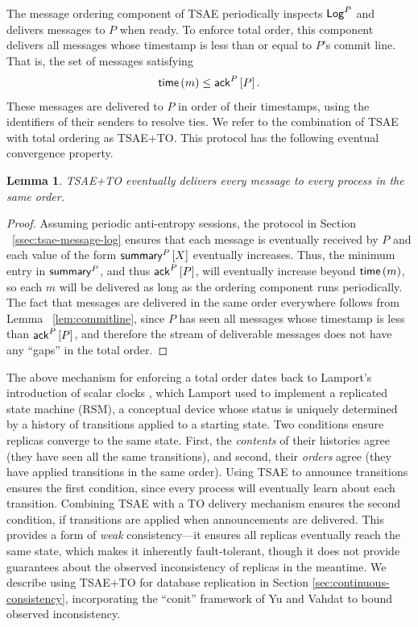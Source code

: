 \documentclass[]             %
{NASA}                       %
\newtheorem{lemma}[theorem]{Lemma}
\theoremstyle{definition}
\begin{document}
The message ordering component of TSAE periodically inspects $\mathsf{Log}^{P}$
and delivers messages to $P$ when ready. To enforce total order, this
component delivers all messages whose timestamp is less than or equal
to $P$'s commit line. That is, the set of messages satisfying
\begin{equation}
  \label{eq:tsae-message-ordering-condition}
  \mathsf{time}\left(m\right) \leq \mathsf{ack}^{P}\left[P\right].
\end{equation}
These messages are delivered to $P$ in order of their timestamps,
using the identifiers of their senders to resolve ties. We refer to
the combination of TSAE with total ordering as TSAE+TO. This protocol
has the following eventual convergence property.

\begin{lemma}
  TSAE+TO eventually delivers every message to every process in the
  same order.
\end{lemma}
\begin{proof}
  Assuming periodic anti-entropy sessions, the protocol in Section
 ~\ref{ssec:tsae-message-log} ensures that each message is eventually
  received by $P$ and each value of the form $\mathsf{summary}^{P}\left[X\right]$
  eventually increases. Thus, the minimum entry in $\mathsf{summary}^{P}$,
  and thus $\mathsf{ack}^{P}\left[P\right]$, will eventually increase beyond
  $\mathsf{time}\left(m\right)$, so each $m$ will be delivered as long as the
  ordering component runs periodically. The fact that messages are
  delivered in the same order everywhere follows from Lemma
 ~\ref{lem:commitline}, since $P$ has seen all messages whose
  timestamp is less than $\mathsf{ack}^{P}\left[P\right]$, and therefore the stream of
  deliverable messages does not have any ``gaps'' in the total order.
\end{proof}

The above mechanism for enforcing a total order dates back to
Lamport's introduction of scalar clocks \cite{1978:lamportclocks},
which Lamport used to implement a replicated state machine (RSM), a
conceptual device whose status is uniquely determined by a history of
transitions applied to a starting state. Two conditions ensure
replicas converge to the same state. First, the \emph{contents} of
their histories agree (they have seen all the same transitions), and
second, their \emph{orders} agree (they have applied transitions in
the same order). Using TSAE to announce transitions ensures the first
condition, since every process will eventually learn about each
transition. Combining TSAE with a TO delivery mechanism ensures the
second condition, if transitions are applied when announcements are
delivered. This provides a form of \emph{weak} consistency---it
ensures all replicas eventually reach the same state, which makes it
inherently fault-tolerant, though it does not provide guarantees about
the observed inconsistency of replicas in the meantime. We describe
using TSAE+TO for database replication in Section
\ref{sec:continuous-consistency}, incorporating the ``conit'' framework of Yu
and Vahdat \cite{2002tact} to bound observed inconsistency.
\end{document}

